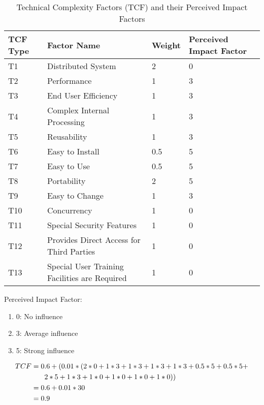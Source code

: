 \begin{enumerate}
\begin{table}[!thb]
\begin{tabularx}{\textwidth}{|l|X|l|l|}
\hline
\textbf{TCF Type} & \textbf{Factor Name} & \textbf{Weight} & \textbf{Perceived Impact Factor} \\
\hline
T1 & Distributed System                     & 2 & 0 \\\hline
T2 & Performance                            & 1 & 3 \\\hline
T3 & End User Efficiency                    & 1 & 3 \\\hline
T4 & Complex Internal Processing            & 1 & 3 \\\hline
T5 & Reusability                            & 1 & 3 \\\hline
T6 & Easy to Install                        & 0.5 & 5\\\hline
T7 & Easy to Use                            & 0.5 & 5\\\hline
T8 & Portability                            & 2 & 5\\\hline
T9 & Easy to Change                         & 1 & 3\\\hline
T10 & Concurrency                            & 1 & 0\\\hline
T11& Special Security Features              & 1 & 0\\\hline
T12 & Provides Direct Access for Third Parties & 1 & 0\\\hline
T13 & Special User Training Facilities are Required & 1 & 0\\\hline
\end{tabularx}
\caption{Technical Complexity Factors (TCF) and their Perceived Impact Factors}
\end{table}

\vspace{8pt}
Perceived Impact Factor:
\begin{enumerate}
    \item 0: No influence
    \item 3: Average influence
    \item 5: Strong influence
\end{enumerate}

\begin{align}
    TCF     &= 0.6 + (0.01 * (2*0 + 1*3 + 1*3 + 1*3 +1*3 + 0.5*5 + 0.5*5 + \\
            &\phantom{{}=1}2*5+ 1*3 + 1*0+ 1*0 + 1*0 + 1*0))  \notag\\
            &= 0.6 + 0.01 * 30 \\        
            &= 0.9
\end{align}


\end{enumerate}
